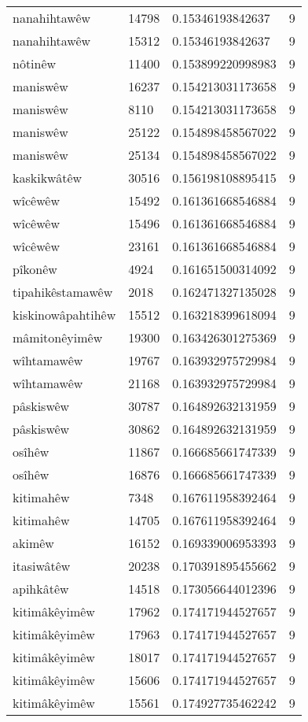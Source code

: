 \begin{longtable}{llll}
nanahihtawêw & 14798 & 0.15346193842637 & 9\\
nanahihtawêw & 15312 & 0.15346193842637 & 9\\
nôtinêw & 11400 & 0.153899220998983 & 9\\
maniswêw & 16237 & 0.154213031173658 & 9\\
maniswêw & 8110 & 0.154213031173658 & 9\\
maniswêw & 25122 & 0.154898458567022 & 9\\
maniswêw & 25134 & 0.154898458567022 & 9\\
kaskikwâtêw & 30516 & 0.156198108895415 & 9\\
wîcêwêw & 15492 & 0.161361668546884 & 9\\
wîcêwêw & 15496 & 0.161361668546884 & 9\\
wîcêwêw & 23161 & 0.161361668546884 & 9\\
pîkonêw & 4924 & 0.161651500314092 & 9\\
tipahikêstamawêw & 2018 & 0.162471327135028 & 9\\
kiskinowâpahtihêw & 15512 & 0.163218399618094 & 9\\
mâmitonêyimêw & 19300 & 0.163426301275369 & 9\\
wîhtamawêw & 19767 & 0.163932975729984 & 9\\
wîhtamawêw & 21168 & 0.163932975729984 & 9\\
pâskiswêw & 30787 & 0.164892632131959 & 9\\
pâskiswêw & 30862 & 0.164892632131959 & 9\\
osîhêw & 11867 & 0.166685661747339 & 9\\
osîhêw & 16876 & 0.166685661747339 & 9\\
kitimahêw & 7348 & 0.167611958392464 & 9\\
kitimahêw & 14705 & 0.167611958392464 & 9\\
akimêw & 16152 & 0.169339006953393 & 9\\
itasiwâtêw & 20238 & 0.170391895455662 & 9\\
apihkâtêw & 14518 & 0.173056644012396 & 9\\
kitimâkêyimêw & 17962 & 0.174171944527657 & 9\\
kitimâkêyimêw & 17963 & 0.174171944527657 & 9\\
kitimâkêyimêw & 18017 & 0.174171944527657 & 9\\
kitimâkêyimêw & 15606 & 0.174171944527657 & 9\\
kitimâkêyimêw & 15561 & 0.174927735462242 & 9\\

\end{longtable}
